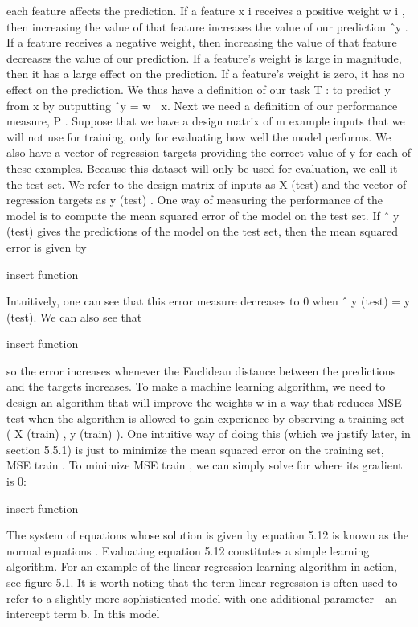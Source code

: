 \documentclass[11pt]{article}
\begin{document}
each feature aﬀects the prediction. If a feature
x
i
receives a positive weight
w
i
,
then increasing the value of that feature increases the value of our prediction
ˆy
.
If a feature receives a negative weight, then increasing the value of that feature
decreases the value of our prediction. If a feature’s weight is large in magnitude,
then it has a large eﬀect on the prediction. If a feature’s weight is zero, it has no
eﬀect on the prediction.
We thus have a deﬁnition of our task
T
: to predict
y
from
x
by outputting
ˆy = w

x. Next we need a deﬁnition of our performance measure, P .
Suppose that we have a design matrix of
m
example inputs that we will not
use for training, only for evaluating how well the model performs. We also have
a vector of regression targets providing the correct value of
y
for each of these
examples. Because this dataset will only be used for evaluation, we call it the test
set. We refer to the design matrix of inputs as
X
(test)
and the vector of regression
targets as y
(test)
.
One way of measuring the performance of the model is to compute the
mean
squared error
of the model on the test set. If
ˆ
y
(test)
gives the predictions of the
model on the test set, then the mean squared error is given by

    insert function

Intuitively, one can see that this error measure decreases to 0 when
ˆ
y
(test)
=
y
(test).
We can also see that

    insert function

so the error increases whenever the Euclidean distance between the predictions
and the targets increases.
To make a machine learning algorithm, we need to design an algorithm that
will improve the weights
w
in a way that reduces
MSE
test
when the algorithm
is allowed to gain experience by observing a training set (
X
(train)
, y
(train)
). One
intuitive way of doing this (which we justify later, in section 5.5.1) is just to
minimize the mean squared error on the training set, MSE
train
.
To minimize MSE
train
, we can simply solve for where its gradient is 0:

    insert function

The system of equations whose solution is given by equation 5.12 is known as
the
normal equations
. Evaluating equation 5.12 constitutes a simple learning
algorithm. For an example of the linear regression learning algorithm in action,
see ﬁgure 5.1.
It is worth noting that the term
linear regression
is often used to refer to
a slightly more sophisticated model with one additional parameter—an intercept
term b. In this model
\end{document}
